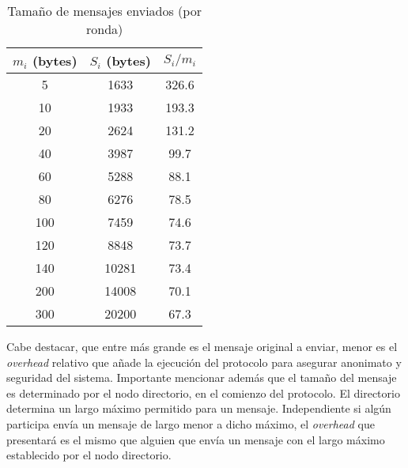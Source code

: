 \begin{table}[h!]
\centering
\begin{tabular}[h!]{|c|c|c|}
\hline
$m_i$ (bytes) & $S_i$ (bytes) & $S_i / m_i$ \\ \hline
5                                   & 1633                               & 326.6       \\ \hline
10                                  & 1933                               & 193.3       \\ \hline
20                                  & 2624                               & 131.2       \\ \hline
40                                  & 3987                               & 99.7        \\ \hline
60                                  & 5288                               & 88.1        \\ \hline
80                                  & 6276                               & 78.5        \\ \hline
100                                 & 7459                               & 74.6        \\ \hline
120                                 & 8848                               & 73.7        \\ \hline
140                                 & 10281                              & 73.4        \\ \hline
200                                 & 14008                              & 70.1        \\ \hline
300                                 & 20200                              & 67.3        \\ \hline
\end{tabular}
\caption{Tamaño de mensajes enviados (por ronda)}
\label{table:message_sizes_table}
\end{table}

Cabe destacar, que entre más grande es el mensaje original a enviar, menor es el \emph{overhead} relativo que añade la ejecución del protocolo para asegurar anonimato y seguridad del sistema. Importante mencionar además que el tamaño del mensaje es determinado por el nodo directorio, en el comienzo del protocolo. El directorio determina un largo máximo permitido para un mensaje. Independiente si algún participa envía un mensaje de largo menor a dicho máximo, el \emph{overhead} que presentará es el mismo que alguien que envía un mensaje con el largo máximo establecido por el nodo directorio.